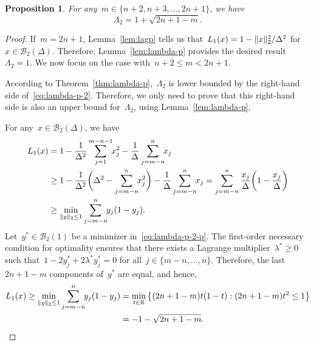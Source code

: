 \documentclass{article}
\numberwithin{equation}{section}
\theoremstyle{definition}
\theoremstyle{plain}
\newtheorem{proposition}{Proposition}[section]
\theoremstyle{remark}
\newcommand*{\lagp}[1][]{L\ifblank{#1}{}{_{#1}}}
\newcommand*{\norm}[2][]{#1\lVert#2#1\rVert}
\newcommand*{\R}{\mathbb{R}}
\newcommand*{\set}[2][]{#1\{#2#1\}}
\begin{document}
\begin{proposition}
    \label{prop:lambda-p-2}
    For any~$m \in \set{n + 2, n + 3, \dots, 2n + 1}$, we have
    \begin{equation}
        \label{eq:lambda-p-2}
        \Lambda_2 = 1 + \sqrt{2n + 1 - m}.
    \end{equation}
\end{proposition}

\begin{proof}
    If~$m = 2n + 1$, Lemma~\ref{lem:lagp} tells us that~$\lagp[1](x) = 1 - \norm{x}_2^2 / \Delta^2$ for~$x \in \mathcal{B}_2(\Delta)$.
    Therefore, Lemma~\ref{lem:lambda-p} provides the desired result~$\Lambda_2 = 1$.
    We now focus on the case with~$n + 2 \le m < 2n + 1$.

    According to Theorem~\ref{thm:lambda-p},~$\Lambda_2$ is lower bounded by the right-hand side of~\eqref{eq:lambda-p-2}.
    Therefore, we only need to prove that this right-hand side is also an upper bound for~$\Lambda_2$, using Lemma~\ref{lem:lambda-p}.

    For any~$x \in \mathcal{B}_2(\Delta)$, we have
    \begin{align}
        \lagp[1](x) &= 1 - \frac{1}{\Delta^2} \sum_{j = 1}^{m - n - 1} \!\! x_j^2 - \frac{1}{\Delta} \sum_{j = m - n}^n \!\! x_j \nonumber\\
                    &\ge 1 - \frac{1}{\Delta^2} \bigg( \Delta^2 - \sum_{j = m - n}^n \!\! x_j^2 \bigg) - \frac{1}{\Delta} \sum_{j = m - n}^n \!\! x_j = \sum_{j = m - n}^n \frac{x_j}{\Delta} \bigg( 1 - \frac{x_j}{\Delta} \bigg) \nonumber\\
                    &\ge \min_{\norm{y}_2 \le 1} \sum_{j = m - n}^n \!\! y_j (1 - y_j). \label{eq:lambda-p-2-p}
    \end{align}
    Let~$y^{\ast} \in \mathcal{B}_2(1)$ be a minimizer in~\eqref{eq:lambda-p-2-p}.
    The first-order necessary condition for optimality ensures that there exists a Lagrange multiplier~$\lambda^{\ast} \ge 0$ such that~$1 - 2 y_j^{\ast} + 2 \lambda^{\ast} y_j^{\ast} = 0$ for all~$j \in \set{m - n, \dots, n}$.
    Therefore, the last~$2n + 1 - m$ components of~$y^{\ast}$ are equal, and hence,
    \begin{align*}
        \lagp[1](x) \ge \min_{\norm{y}_2 \le 1} \sum_{j = m - n}^n \!\! y_j (1 - y_j)   & = \min_{t \in \R} \set[\big]{(2n + 1 - m) t (1 - t) : (2n + 1 - m) t^2 \le 1}\\
                                                                                        & = -1 - \sqrt{2n + 1 - m}.
    \end{align*}


\end{proof}
\end{document}
